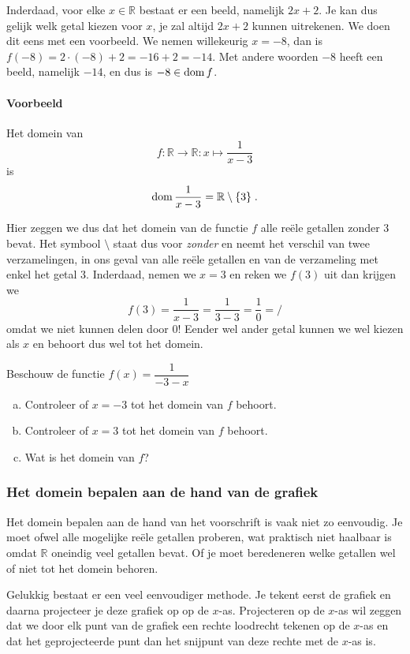 \documentclass[12pt,twoside]{article}
\begin{document}
Inderdaad, voor elke $x\in\mathbb{R}$ bestaat er een beeld, namelijk $2x+2$. Je kan dus gelijk welk getal kiezen voor $x$, je zal altijd $2x+2$ kunnen uitrekenen. We doen dit eens met een voorbeeld. We nemen willekeurig $x=-8$, dan is $f(-8)=2\cdot(-8)+2=-16+2=-14$. Met andere woorden $-8$ heeft een beeld, namelijk $-14$, en dus is $-8\in\dom f$.

\paragraph{Voorbeeld}
Het domein van
$$f:\mathbb{R}\to\mathbb{R}:x\mapsto \dfrac{1}{x-3}$$
is
$$\dom \dfrac{1}{x-3} = \mathbb{R}\setminus\{3\}\;.$$

Hier zeggen we dus dat het domein van de functie $f$ alle reële getallen zonder $3$ bevat. Het symbool $\setminus$ staat dus voor {\em zonder} en neemt het verschil van twee verzamelingen, in ons geval van alle reële getallen en van de verzameling met enkel het getal $3$. Inderdaad, nemen we $x=3$ en reken we $f(3)$ uit dan krijgen we
$$f(3)=\dfrac{1}{x-3}=\dfrac{1}{3-3}=\dfrac{1}{0}=/$$
omdat we niet kunnen delen door $0$! Eender wel ander getal kunnen we wel kiezen als $x$ en behoort dus wel tot het domein.

\begin{oefening}
Beschouw de functie $\displaystyle f(x)=\dfrac{1}{-3-x}$
\begin{enumerate}[(a)]
  \item Controleer of $x=-3$ tot het domein van $f$ behoort.
  \item Controleer of $x=3$ tot het domein van $f$ behoort.
  \item Wat is het domein van $f$?
\end{enumerate}
\end{oefening}

\subsubsection{Het domein bepalen aan de hand van de grafiek}

Het domein bepalen aan de hand van het voorschrift is vaak niet zo eenvoudig. Je moet ofwel alle mogelijke reële getallen proberen, wat praktisch niet haalbaar is omdat $\mathbb{R}$ oneindig veel getallen bevat. Of je moet beredeneren welke getallen wel of niet tot het domein behoren.

Gelukkig bestaat er een veel eenvoudiger methode. Je tekent eerst de grafiek en daarna projecteer je deze grafiek op op de $x$-as. Projecteren op de $x$-as wil zeggen dat we door elk punt van de grafiek een rechte loodrecht tekenen op de $x$-as en dat het geprojecteerde punt dan het snijpunt van deze rechte met de $x$-as is.
\end{document}
